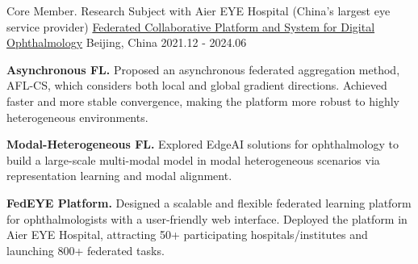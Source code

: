 \begin{cventries}


\cventry
{Core Member. Research Subject with Aier EYE Hospital (China's largest eye service provider)}
{\href{https://fedeye.aierchina.com/}{Federated Collaborative Platform and System for Digital Ophthalmology}}
{Beijing, China}
{2021.12 - 2024.06}
{
\begin{cvitems}
\item {\textbf{Asynchronous FL.} Proposed an asynchronous federated aggregation method, AFL-CS, which considers both local and global gradient directions. Achieved faster and more stable convergence, making the platform more robust to highly heterogeneous environments.}
\item {\textbf{Modal-Heterogeneous FL.} Explored EdgeAI solutions for ophthalmology to build a large-scale multi-modal model in modal heterogeneous scenarios via representation learning and modal alignment.}
\item {\textbf{FedEYE Platform.} Designed a scalable and flexible federated learning platform for ophthalmologists with a user-friendly web interface. Deployed the platform in Aier EYE Hospital, attracting \textcolor{awesome-red}{50+} participating hospitals/institutes and launching \textcolor{awesome-red}{800+} federated tasks.}
\end{cvitems}
}


\end{cventries}
